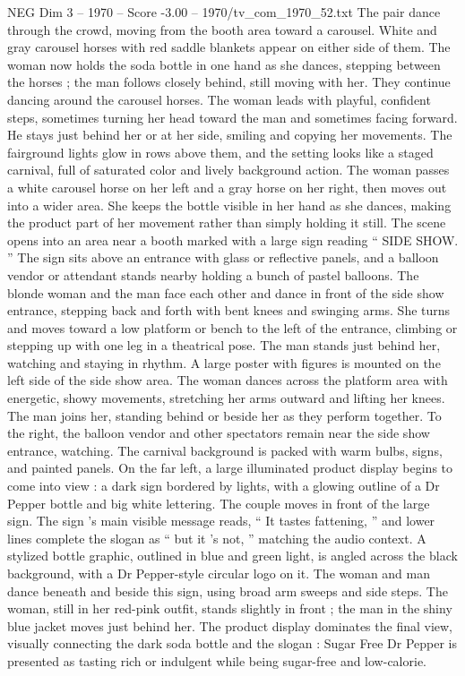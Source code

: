 \begin{textsample}{NEG Dim 3 – 1970 – Score -3.00 – 1970/tv\_com\_1970\_52.txt}
The pair dance through the crowd, moving from the booth area toward a carousel.
White and gray carousel horses with red saddle blankets appear on either side of them.
The woman now holds the soda bottle in one hand as she dances, stepping between the horses ; the man follows closely behind, still moving with her.
They continue dancing around the carousel horses.
The woman leads with playful, confident steps, sometimes turning her head toward the man and sometimes facing forward.
He stays just behind her or at her side, smiling and copying her movements.
The fairground lights glow in rows above them, and the setting looks like a staged carnival, full of saturated color and lively background action.
The woman passes a white carousel horse on her left and a gray horse on her right, then moves out into a wider area.
She keeps the bottle visible in her hand as she dances, making the product part of her movement rather than simply holding it still.
The scene opens into an area near a booth marked with a large sign reading “ SIDE SHOW. ” The sign sits above an entrance with glass or reflective panels, and a balloon vendor or attendant stands nearby holding a bunch of pastel balloons.
The blonde woman and the man face each other and dance in front of the side show entrance, stepping back and forth with bent knees and swinging arms.
She turns and moves toward a low platform or bench to the left of the entrance, climbing or stepping up with one leg in a theatrical pose.
The man stands just behind her, watching and staying in rhythm.
A large poster with figures is mounted on the left side of the side show area.
The woman dances across the platform area with energetic, showy movements, stretching her arms outward and lifting her knees.
The man joins her, standing behind or beside her as they perform together.
To the right, the balloon vendor and other spectators remain near the side show entrance, watching.
The carnival background is packed with warm bulbs, signs, and painted panels.
On the far left, a large illuminated product display begins to come into view : a dark sign bordered by lights, with a glowing outline of a Dr Pepper bottle and big white lettering.
The couple moves in front of the large sign.
The sign ’s main visible message reads, “ It tastes fattening, ” and lower lines complete the slogan as “ but it ’s not, ” matching the audio context.
A stylized bottle graphic, outlined in blue and green light, is angled across the black background, with a Dr Pepper-style circular logo on it.
The woman and man dance beneath and beside this sign, using broad arm sweeps and side steps.
The woman, still in her red-pink outfit, stands slightly in front ; the man in the shiny blue jacket moves just behind her.
The product display dominates the final view, visually connecting the dark soda bottle and the slogan : Sugar Free Dr Pepper is presented as tasting rich or indulgent while being sugar-free and low-calorie.

\end{textsample}
